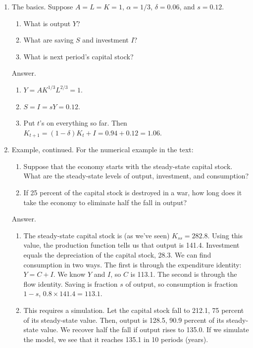 \setlength{\leftmargini}{.5\oldleftmargini}
\begin{enumerate}

\item The basics.  Suppose $A=L=K=1$, $\alpha = 1/3$, $\delta = 0.06$, and $s = 0.12$.
\begin{enumerate}
\item What is output $Y$?
\item What are saving $S$ and investment $I$?
\item What is next period's capital stock?
\end{enumerate}

Answer.
\begin{enumerate}
\item $Y = A K^{1/3} L^{2/3} = 1$.
\item $S=I = s Y = 0.12$.
\item Put $t$'s on everything so far.
Then $K_{t+1} = (1-\delta) K_t + I = 0.94 + 0.12 = 1.06$.
\end{enumerate}


\item Example, continued.  For the numerical example in the text:
\begin{enumerate}
\item Suppose that the economy starts with the steady-state capital stock.
What are the steady-state levels of output, investment, and consumption?
\item If 25 percent of the capital stock is destroyed in a war,
how long does it take the economy to eliminate half the fall in output?
\end{enumerate}

Answer.
\begin{enumerate}
\item The steady-state capital stock is (as we've seen) $K_{ss} = 282.8$.
Using this value, the production function tells us that output is 141.4.
Investment equals the depreciation of the capital stock, 28.3.
We can find consumption in two ways.
The first is through the expenditure identity:  $Y = C + I$.
We know $Y$ and $I$, so $C$ is 113.1.
The second is through the flow identity.
Saving is fraction $s$ of output, so consumption is fraction $1-s$,
$ 0.8 \times 141.4 = 113.1 $.
\item This requires a simulation.
Let the capital stock fall to 212.1, 75 percent of its steady-state value.
Then, output is 128.5, 90.9 percent of its steady-state value.
We recover half the fall if output rises to 135.0.
If we simulate the model, we see that it reaches 135.1 in 10 periods (years).
\end{enumerate}


\end{enumerate}
